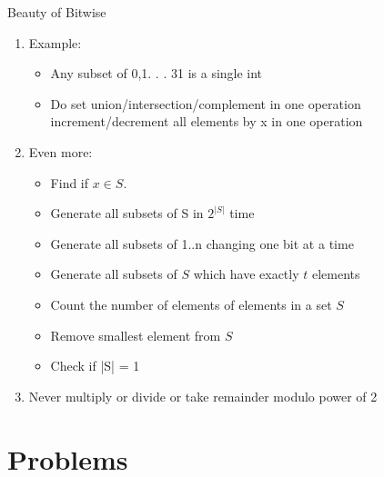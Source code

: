 \documentclass{beamer}
\begin{document}
\begin{frame}[<+->]{Beauty of Bitwise}
\begin{enumerate}
  \item Example:\\
    \begin{itemize}
      \item Any subset of {0,1. . . 31} is a single int\\
      \item Do set union/intersection/complement in one operation increment/decrement all elements by x in one operation\\
    \end{itemize}
  \item Even more:\\
    \begin{itemize}
      \item Find if $x \in S$.\\
      \item Generate all subsets of S in $2^{|S|}$ time\\
      \item Generate all subsets of {1..n} changing one bit at a time\\
      \item Generate all subsets of $S$ which have exactly $t$ elements\\
      \item Count the number of elements of elements in a set $S$\\
      \item Remove smallest element from $S$\\
      \item Check if |S| = 1
    \end{itemize}
   \item Never multiply or divide or take remainder modulo power of 2
\end{enumerate}
\end{frame}

\section{Problems}
\end{document}
